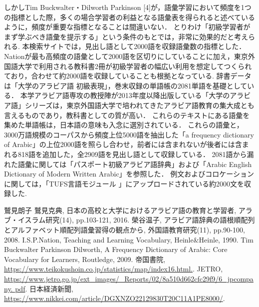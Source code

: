 \documentclass[technicalreport]{ieicej}
\begin{document}
しかしTim Buckwalter・Dilworth Parkinson [4]が，語彙学習において頻度を1つの指標とした際，多くの場合学習者の利益となる語彙表を得られると述べているように，頻度が重要な指標となることは間違いない．
とりわけ「初級学習者がまず学ぶべき語彙を提示する」という条件のもとでは，非常に効果的だと考えられる.
本検索サイトでは，見出し語として2000語を収録語彙数の指標とした．
Nationが最も高頻度の語彙として2000語を区切りにしていることに加え，東京外国語大学で利用される教科書2冊が初級学習者の幅広い利用を想定してつくられており，合わせて約2000語を収録していることも根拠となっている.
辞書データは「大学のアラビア語 初級表現」，巻末収録の単語帳の2081単語を基礎としている．
本学アラビア語専攻の教授陣が2013年度以降出版している「大学のアラビア語」シリーズは，東京外国語大学で培われてきたアラビア語教育の集大成とも言えるものであり，教科書としての質が高い．
これらのテキストにある語彙を集めた単語帳は，日本語の意味も入念に選別されている．
これらの語彙と，3000万語規模のコーパスから頻度上位5000語を抽出した「a frequency dictionary of Arabic」の上位2000語を照らし合わせ，前者には含まれないが後者には含まれる818語を追加した，全2909語を見出し語として収録している．
2081語から漏れた語彙に関しては「パスポート初級アラビア語辞典」および「Arabic English Dictionary of Modern Written Arabic」を参照した．
例文およびコロケーションに関しては，「TUFS言語モジュール 」にアップロードされている約2000文を収録した.
\begin{thebibliography}{99}
鷲見朗子 鷲見克典, 日本の高校と大学におけるアラビア語の教育と学習者, アラブ・イスラム研究(14), pp.103-121, 2016.
榮谷温子, アラビア語辞典の語根順配列とアルファベット順配列語彙習得の観点から, 外国語教育研究(11), pp.90-100, 2008.
I.S.P.Nation, Teaching and Learning Vocabulary, Heinle\&Heinle, 1990. 
Tim Buckwalter  Parkinson Dilworth, A Frequency Dictionary of Arabic: Core Vocabulary for Learners, Routledge, 2009.
帝国書院, \url{https://www.teikokushoin.co.jp/statistics/map/index16.html.}.
JETRO, \url{https://www.jetro.go.jp/ext_images/_Reports/02/8a510d662cfc29f9/6_jpcompany. pdf}.
日本経済新聞, \url{https://www.nikkei.com/article/DGXNZO22129830T20C11A1PE8000/}.
\end{thebibliography}
\end{document}
